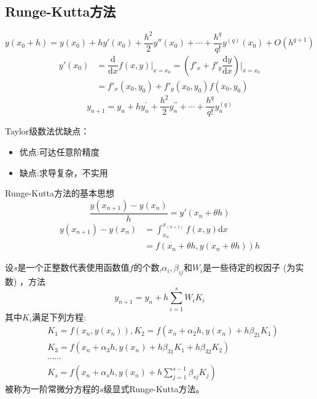 \subsection{Runge-Kutta方法}
\begin{definition}[Taylor级数法]
    \[
        y(x_{0}+h) =y(x_0)+hy'(x_0)+\frac{h^2}2y''(x_0)+\cdots+\frac{h^{q}}{q!}y^{(q)}(x_{0})+O(h^{q+1}) 
    \]
    \[
        \begin{aligned}
            y'(x_0) &= \dfrac{\mathrm{d}}{\mathrm{d}x}f(x,y)\big|_{x = x_0}=(f'_x+f'_y\dfrac{\mathrm{d}y}{\mathrm{d}x})\big|_{x = x_0}\\
            & = f'_x(x_0,y_0) + f'_y(x_0,y_0)f(x_0,y_0)
        \end{aligned}
    \]
    \[
        y_{n+1}=y_n+hy_n^{\prime}+\frac{h^2}2y_n^{\prime\prime}+\cdots+\frac{h^q}{q!}y_n^{(q)}
    \]
\end{definition}
\begin{note}
    Taylor级数法优缺点：
    \begin{itemize}
        \item 优点:可达任意阶精度
        \item 缺点:求导复杂，不实用
    \end{itemize}
\end{note}
\begin{note}
    Runge-Kutta方法的基本思想
    \[
        \frac{y(x_{n+1})-y(x_n)}h=y'(x_n+\theta h)
    \]
    \[
        \begin{aligned}
             y(x_{n+1})-y(x_n)&=\int_{x_{n}}^{x_{(n+1)}}f(x,y)\mathrm{d}x\\
             &=f(x_{n}+\theta h,y(x_n+\theta h))h
        \end{aligned}
     \]
\end{note}
\begin{definition}
    设$s$是一个正整数代表使用函数值$f$的个数,$\alpha_i,\beta_{ij}$和$W_{i}$是一些待定的权因子 (为实数) ，方法
    \[
        y_{n+1}=y_n+h\sum_{i=1}^sW_iK_i
    \]
    其中$K_i$满足下列方程:
    \[
        \begin{aligned}
            &K_{1}=f(x_{n},y(x_{n})),K_{2}=f(x_{n}+\alpha_{2}h,y(x_{n})+h\beta_{21}K_{1})\\
            &K_{3}=f(x_{n}+\alpha_{3}h,y(x_{n})+h\beta_{31}K_{1}+h\beta_{32}K_{2})\\
            &\cdots\cdots\\
            &K_{s}=f(x_{n}+\alpha_{s}h,y(x_{n})+h\sum_{j=1}^{s-1}\beta_{sj}K_{j})
        \end{aligned}
    \]
    被称为一阶常微分方程的$s$级\textcolor{red!50}{显式}Runge-Kutta方法。
\end{definition}
